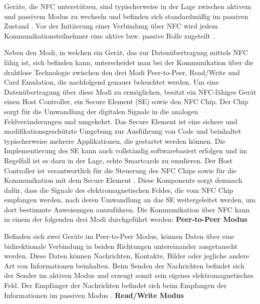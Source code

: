Geräte, die NFC unterstützen, sind typischerweise in der Lage zwischen aktivem und passivem Modus zu wechseln und befinden sich standardmäßig im passiven Zustand \cite{cuno:nfc}. Vor der Initiierung einer Verbindung über NFC wird jedem Kommunikationsteilnehmer eine aktive bzw. passive Rolle zugeteilt \cite{Madlmayr2014}. 

Neben den Modi, in welchen ein Gerät, das zur Datenübertragung mittels NFC fähig ist, sich befinden kann, unterscheidet man bei der Kommunikation über die drahtlose Technologie zwischen den drei Modi Peer-to-Peer, Read/Write und Card Emulation, die nachfolgend genauer beleuchtet werden. Um eine Datenübertragung über diese Modi zu ermöglichen, besitzt ein NFC-fähiges Gerät einen Host Controller, ein Secure Element (SE) sowie den NFC Chip. Der Chip sorgt für die Umwandlung der digitalen Signale in die analogen Feldveränderungen und umgekehrt. Das Secure Element ist eine sichere und modifikationsgeschützte Umgebung zur Ausführung von Code und beinhaltet typischerweise mehrere Applikationen, die gestartet werden können. Die Implementierung des SE kann auch vollständig softwarebasiert erfolgen und im Regelfall ist es dazu in der Lage, echte Smartcards zu emulieren. 
Der Host Controller ist verantwortlich für die Steuerung des NFC Chips sowie für die Kommunikation mit dem Secure Element \cite{Madlmayr2014}. Diese Komponente sorgt demnach dafür, dass die Signale des elektromagnetischen Feldes, die vom NFC Chip empfangen werden, nach deren Umwandlung an das SE weitergeleitet werden, um dort bestimmte Anweisungen auszuführen. 
\newline
\newline
Die Kommunikation über NFC kann in einem der folgenden drei Modi durchgeführt werden: 
\newline
\newline
\textbf{Peer-to-Peer Modus}

Befinden sich zwei Geräte im Peer-to-Peer Modus, können Daten über eine bidirektionale Verbindung in beiden Richtungen untereinander ausgetauscht werden. Diese Daten können Nachrichten, Kontakte, Bilder oder jegliche andere Art von Informationen beinhalten. Beim Senden der Nachrichten befindet sich der Sender im aktiven Modus und erzeugt somit sein eigenes elektromagnetisches Feld. Der Empfänger der Nachrichten befindet sich beim Empfangen der Informationen im passiven Modus \cite{Madlmayr2014, nfcHealthMonitoring}. 
\newline
\newline
\textbf{Read/Write Modus}

